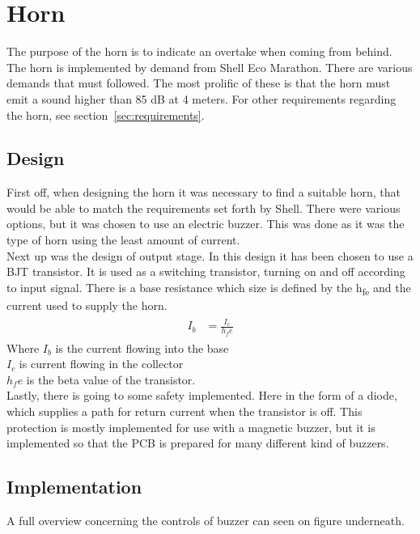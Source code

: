 \section{Horn}
The purpose of the horn is to indicate an overtake when coming from behind. The horn is implemented by demand from Shell Eco Marathon. There are various demands that must followed. The most prolific of these is that the horn must emit a sound higher than 85 dB at 4 meters. For other requirements regarding the horn, see section~\ref{sec:requirements}.  

\subsection{Design}
First off, when designing the horn it was necessary to find a suitable horn, that would be able to match the requirements set forth by Shell. There were various options, but it was chosen to use an electric buzzer. This was done as it was the type of horn using the least amount of current. \\
Next up was the design of output stage. In this design it has been chosen to use a BJT transistor. It is used as a switching transistor, turning on and off according to input signal. There is a base resistance which size is defined by the h\textsubscript{fe} and the current used to supply the horn. \\
\begin{align}
	\begin{split}
		I_b &= \frac{I_c}{h_fe}
	\end{split}
\end{align}
Where $I_b$ is the current flowing into the base \\ 
$I_c$ is current flowing in the collector \\ 
$h_fe$ is the beta value of the transistor. \\

Lastly, there is going to some safety implemented. Here in the form of a diode, which supplies a path for return current when the transistor is off. This protection is mostly implemented for use with a magnetic buzzer, but it is implemented so that the PCB is prepared for many different kind of buzzers.   

\subsection{Implementation}
A full overview concerning the controls of buzzer can seen on figure underneath.

